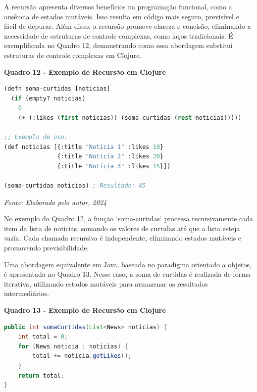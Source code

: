 A recursão apresenta diversos benefícios na programação funcional, como a ausência de estados mutáveis. Isso resulta em código mais seguro, previsível e fácil de depurar. Além disso, a recursão promove clareza e concisão, eliminando a necessidade de estruturas de controle complexas, como laços tradicionais. É exemplificada no Quadro 12, demonstrando como essa abordagem substitui estruturas de controle complexas em Clojure.

\begin{center}
    \textbf{Quadro 12 - Exemplo de Recursão em Clojure}
\end{center}

\begin{tcolorbox}[colback=gray!5!white, colframe=gray!75!black, title=]
\begin{lstlisting}[language=Lisp]
(defn soma-curtidas [noticias]
  (if (empty? noticias)
    0
    (+ (:likes (first noticias)) (soma-curtidas (rest noticias)))))

;; Exemplo de uso:
(def noticias [{:title "Notícia 1" :likes 10}
               {:title "Notícia 2" :likes 20}
               {:title "Notícia 3" :likes 15}])

(soma-curtidas noticias) ; Resultado: 45
\end{lstlisting}
\end{tcolorbox}

\begin{center}
    \textit{Fonte: Elaborado pelo autor, 2024} 
\end{center}

No exemplo do Quadro 12, a função `soma-curtidas` processa recursivamente cada item da lista de notícias, somando os valores de curtidas até que a lista esteja vazia. Cada chamada recursiva é independente, eliminando estados mutáveis e promovendo previsibilidade.

Uma abordagem equivalente em Java, baseada no paradigma orientado a objetos, é apresentada no Quadro 13. Nesse caso, a soma de curtidas é realizada de forma iterativa, utilizando estados mutáveis para armazenar os resultados intermediários.

\begin{center}
    \textbf{Quadro 13 - Exemplo de Recursão em Clojure}
\end{center}
    
\begin{tcolorbox}[colback=gray!5!white, colframe=gray!75!black, title=]
\begin{lstlisting}[language=Java]
public int somaCurtidas(List<News> noticias) {
    int total = 0;
    for (News noticia : noticias) {
        total += noticia.getLikes();
    }
    return total;
}
\end{lstlisting}
\end{tcolorbox}

